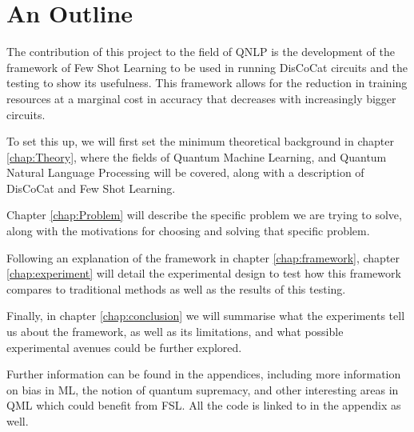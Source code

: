\chapter{An Outline} \label{Scheme}

The contribution of this project to the field of QNLP is the development of the framework of Few Shot Learning to be used in running DisCoCat circuits and the testing to show its usefulness. This framework allows for the reduction in training resources at a marginal cost in accuracy that decreases with increasingly bigger circuits.

To set this up, we will first set the minimum theoretical background in chapter \ref{chap:Theory}, where the fields of Quantum Machine Learning, and Quantum Natural Language Processing will be covered, along with a description of DisCoCat and Few Shot Learning.

Chapter \ref{chap:Problem} will describe the specific problem we are trying to solve, along with the motivations for choosing and solving that specific problem.

Following an explanation of the framework in chapter \ref{chap:framework}, chapter \ref{chap:experiment} will detail the experimental design to test how this framework compares to traditional methods as well as the results of this testing. 

Finally, in chapter \ref{chap:conclusion} we will summarise what the experiments tell us about the framework, as well as its limitations, and what possible experimental avenues could be further explored.

Further information can be found in the appendices, including more information on bias in ML, the notion of quantum supremacy, and other interesting areas in QML which could benefit from FSL. All the code is linked to in the appendix as well.